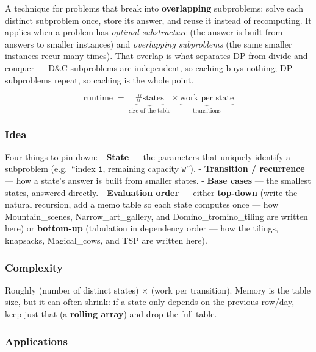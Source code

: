 \documentclass[
  10pt,
  letterpaper,
  onecolumn]{article}
\begin{document}
A technique for problems that break into \textbf{overlapping}
subproblems: solve each distinct subproblem once, store its answer, and
reuse it instead of recomputing. It applies when a problem has
\emph{optimal substructure} (the answer is built from answers to smaller
instances) and \emph{overlapping subproblems} (the same smaller
instances recur many times). That overlap is what separates DP from
divide-and-conquer --- D\&C subproblems are independent, so caching buys
nothing; DP subproblems repeat, so caching is the whole point.

\begin{equation*}
\text{runtime}\;=\;\underbrace{\#\text{states}}_{\text{size of the table}}\times\underbrace{\text{work per state}}_{\text{transitions}}
\end{equation*}

\hypertarget{idea-6}{%
\subsubsection{Idea}\label{idea-6}}

Four things to pin down: - \textbf{State} --- the parameters that
uniquely identify a subproblem (e.g.~``index \texttt{i}, remaining
capacity \texttt{w}''). - \textbf{Transition / recurrence} --- how a
state's answer is built from smaller states. - \textbf{Base cases} ---
the smallest states, answered directly. - \textbf{Evaluation order} ---
either \textbf{top-down} (write the natural recursion, add a memo table
so each state computes once --- how Mountain\_scenes,
Narrow\_art\_gallery, and Domino\_tromino\_tiling are written here) or
\textbf{bottom-up} (tabulation in dependency order --- how the tilings,
knapsacks, Magical\_cows, and TSP are written here).

\hypertarget{complexity-6}{%
\subsubsection{Complexity}\label{complexity-6}}

Roughly (number of distinct states) × (work per transition). Memory is
the table size, but it can often shrink: if a state only depends on the
previous row/day, keep just that (a \textbf{rolling array}) and drop the
full table.

\hypertarget{applications-1}{%
\subsubsection{Applications}\label{applications-1}}
\end{document}
